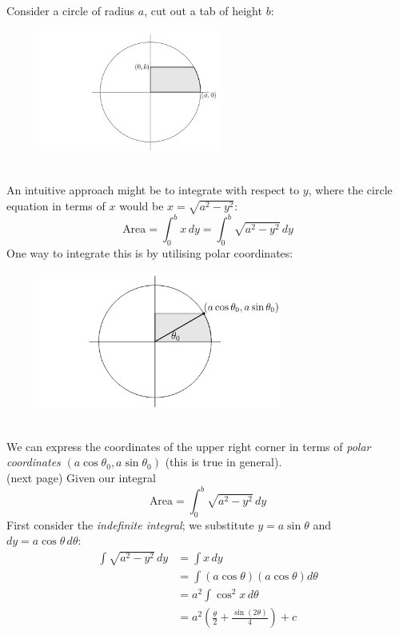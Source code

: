 \documentclass{report}
\begin{document}
Consider a circle of radius $a$, cut out a tab of height $b$:
\begin{figure}[h]
\includegraphics[width=6cm]{Capture42}\\
\centering
{} 
\end{figure}\\
An intuitive approach might be to integrate with respect to $y$, where the circle equation 
in terms of $x$ would be $x=\sqrt{a^2-y^2}$:
\begin{equation*}
\text{Area}=\int_0^bx\,dy=\int_0^b\sqrt{a^2-y^2}\,dy
\end{equation*}
One way to integrate this is by utilising polar coordinates:
\begin{figure}[h]
\includegraphics[width=8cm]{Capture43}\\
\centering
{} 
\end{figure}\\
We can express the coordinates of the upper right corner in terms of \textit{polar coordinates} 
$(a\cos\theta_0,a\sin\theta_0)$ (this is true in general).\\
(next page)
\newpage
\noindent Given our integral
\begin{equation*}
\text{Area}=\int_0^b\sqrt{a^2-y^2}\,dy
\end{equation*}
First consider the \textit{indefinite integral};
we substitute $y=a\sin\theta$ and\\ $dy=a\cos\theta\,d\theta$:
\begin{align*}
\int\sqrt{a^2-y^2}\,dy&=\int x\,dy\\
&=\int(a\cos\theta)(a\cos\theta)d\theta\\
&=a^2\int\cos^2x\,d\theta\\
&=a^2\left(\frac{\theta}{2}+\frac{\sin(2\theta)}{4}\right)+c
\end{align*}
\end{document}
